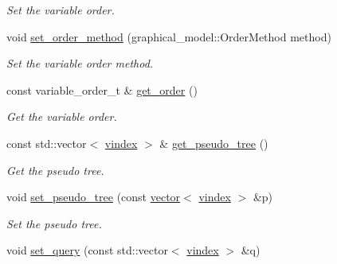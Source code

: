 \begin{DoxyCompactItemize}
\begin{DoxyCompactList}\small\item\em Set the variable order. \end{DoxyCompactList}\item 
void \hyperlink{classmerlin_1_1bte_a0f2ae9278bd12d75b36e1bd2f9f9c41a}{set\+\_\+order\+\_\+method} (graphical\+\_\+model\+::\+Order\+Method method)\hypertarget{classmerlin_1_1bte_a0f2ae9278bd12d75b36e1bd2f9f9c41a}{}\label{classmerlin_1_1bte_a0f2ae9278bd12d75b36e1bd2f9f9c41a}

\begin{DoxyCompactList}\small\item\em Set the variable order method. \end{DoxyCompactList}\item 
const variable\+\_\+order\+\_\+t \& \hyperlink{classmerlin_1_1bte_a7265df78c775c301560f7943e572856c}{get\+\_\+order} ()\hypertarget{classmerlin_1_1bte_a7265df78c775c301560f7943e572856c}{}\label{classmerlin_1_1bte_a7265df78c775c301560f7943e572856c}

\begin{DoxyCompactList}\small\item\em Get the variable order. \end{DoxyCompactList}\item 
const std\+::vector$<$ \hyperlink{classmerlin_1_1bte_afd42180c7906586fb39a0384d096fa4a}{vindex} $>$ \& \hyperlink{classmerlin_1_1bte_ab5a16cc7ffd87dfe7f88576a14178a8e}{get\+\_\+pseudo\+\_\+tree} ()\hypertarget{classmerlin_1_1bte_ab5a16cc7ffd87dfe7f88576a14178a8e}{}\label{classmerlin_1_1bte_ab5a16cc7ffd87dfe7f88576a14178a8e}

\begin{DoxyCompactList}\small\item\em Get the pseudo tree. \end{DoxyCompactList}\item 
void \hyperlink{classmerlin_1_1bte_a4241048db0c6f8f83710dc43fb3b68a7}{set\+\_\+pseudo\+\_\+tree} (const \hyperlink{classmerlin_1_1vector}{vector}$<$ \hyperlink{classmerlin_1_1bte_afd42180c7906586fb39a0384d096fa4a}{vindex} $>$ \&p)\hypertarget{classmerlin_1_1bte_a4241048db0c6f8f83710dc43fb3b68a7}{}\label{classmerlin_1_1bte_a4241048db0c6f8f83710dc43fb3b68a7}

\begin{DoxyCompactList}\small\item\em Set the pseudo tree. \end{DoxyCompactList}\item 
void \hyperlink{classmerlin_1_1bte_a0fe1ed573ea58cbccdbeb934d0014305}{set\+\_\+query} (const std\+::vector$<$ \hyperlink{classmerlin_1_1bte_afd42180c7906586fb39a0384d096fa4a}{vindex} $>$ \&q)\hypertarget{classmerlin_1_1bte_a0fe1ed573ea58cbccdbeb934d0014305}{}\label{classmerlin_1_1bte_a0fe1ed573ea58cbccdbeb934d0014305}


\end{DoxyCompactItemize}
